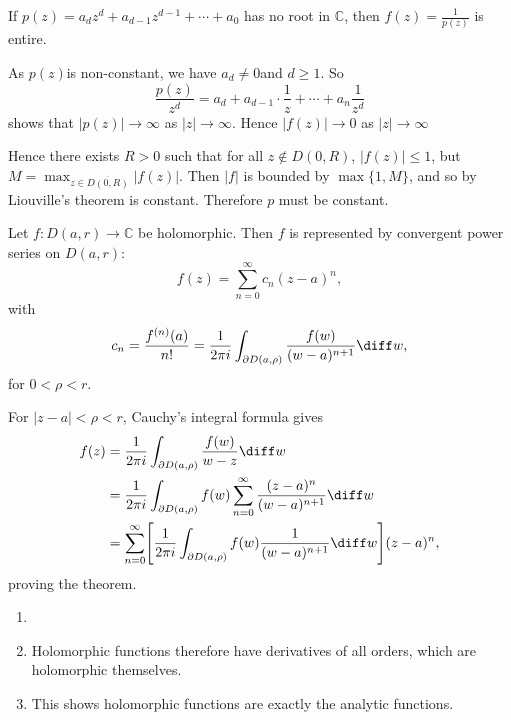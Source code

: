 \documentclass[12pt]{article}
\begin{document}
\begin{proofbox}
	If $p(z) = a_d z^{d} + a_{d-1} z^{d-1} + \cdots + a_0$ has no root in $\mathbb{C}$, then $f(z) = \frac{1}{p(z)}$ is entire.

	As $p(z)$is non-constant, we have $a_d \neq 0$and $d \geq 1$. So
	\[
	\frac{p(z)}{z^{d}} = a_d + a_{d-1} \cdot \frac{1}{z} + \cdots + a_n \frac{1}{z^{d}}
	\]
	shows that $|p(z)| \to \infty$ as $|z| \to \infty$. Hence $|f(z)| \to 0$ as $|z| \to \infty$ 

	Hence there exists $R > 0$ such that for all $z \not \in D(0, R)$, $|f(z)| \leq 1$, but $M = \max_{z \in \overline{D(0,R)}} |f(z)|$. Then $|f|$ is bounded by $\max\{1, M\}$, and so by Liouville's theorem is constant. Therefore $p$ must be constant.
\end{proofbox}

\begin{theorem}
	Let $f : D(a, r) \to \mathbb{C}$ be holomorphic. Then $f$ is represented by convergent power series on $D(a, r)$:
	\[
	f(z) = \sum_{n = 0}^{\infty} c_n (z - a)^{n}
	,\]
	with
	\[
	c_n = \frac{f^{(n)}(a)}{n!} = \frac{1}{2 \pi i} \int_{\partial D(a, \rho)} \frac{f(w)}{(w - a)^{n+1}} \diff w
	,\]
	for $0 < \rho < r$.
\end{theorem}

\begin{proofbox}
	For $|z - a| < \rho < r$, Cauchy's integral formula gives
	\begin{align*}
		f(z) &= \frac{1}{2 \pi i} \int_{\partial D(a, \rho)} \frac{f(w)}{w - z} \diff w \\
		     &= \frac{1}{2 \pi i} \int_{\partial D(a, \rho)}f(w) \sum_{n = 0}^{\infty} \frac{(z - a)^{n}}{(w - a)^{n+1}} \diff w \\
		     &= \sum_{n = 0}^{\infty}\Biggl[ \frac{1}{2 \pi i} \int_{\partial D(a, \rho)}f(w) \frac{1}{(w - a)^{n+1}} \diff w \Biggr] (z - a)^{n},
	\end{align*}
	proving the theorem.
\end{proofbox}

\begin{remark}
	\begin{enumerate}
		\item[]
		\item Holomorphic functions therefore have derivatives of all orders, which are holomorphic themselves.
		\item This shows holomorphic functions are exactly the analytic functions.
	\end{enumerate}
\end{remark}
\end{document}
